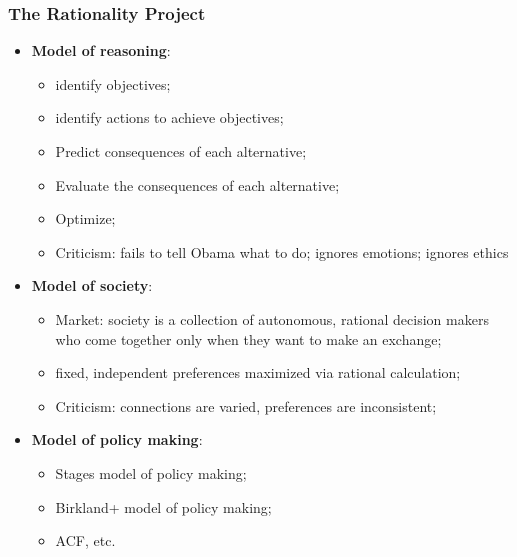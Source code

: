 \documentclass[aspectratio=169]{beamer}
\theoremstyle{principle}
\begin{document}
\begin{frame}
\frametitle{The Rationality Project}

\begin{itemize}
\item \textbf{Model of reasoning}:
\begin{itemize}
\item identify objectives;
\item identify actions to achieve objectives;
\item Predict consequences of each alternative;
\item Evaluate the consequences of each alternative;
\item Optimize;
\item Criticism: fails to tell Obama what to do; ignores emotions; ignores ethics
\end{itemize}
\bigskip
\item \textbf{Model of society}:
\begin{itemize}
\item Market: society is a collection of autonomous, rational decision makers who come together only when they want to make an exchange;
\item fixed, independent preferences maximized via rational calculation;
\item Criticism: connections are varied, preferences are inconsistent;
\end{itemize}
\bigskip
\item \textbf{Model of policy making}:
\begin{itemize}
\item Stages model of policy making;
\item Birkland+ model of policy making;
\item ACF, etc.
\end{itemize}

\end{itemize} 

\end{frame}
\end{document}
